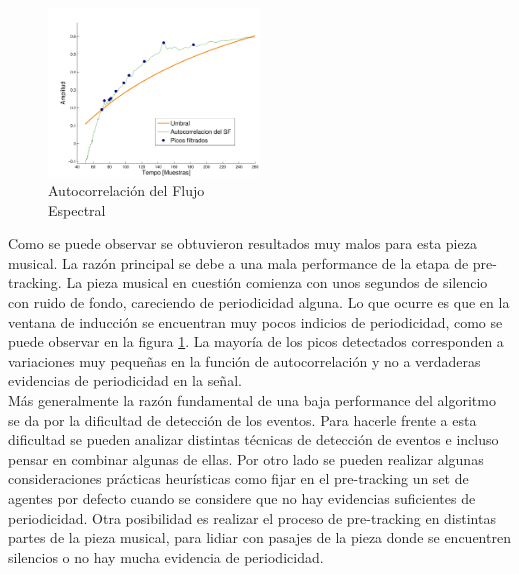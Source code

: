 \documentclass[12pt,a4paper,titlepage]{report}
\begin{document}
\begin{figure}
	\vspace{-45pt}
	\begin{center}
	\includegraphics[width=0.5\textwidth]{./pics/datos_2_18_A_autocorr.pdf}
	\end{center}
	\vspace{-20pt}
	\caption{Autocorrelación del Flujo\\Espectral}
	\label{fig:datos_2_18_A_autocorr}
	\vspace{-15pt}
\end{figure}

Como se puede observar se obtuvieron resultados muy malos para esta pieza musical. La razón principal se debe a una mala performance de la etapa de pre-tracking. La pieza musical en cuestión comienza con unos segundos de silencio con ruido de fondo, careciendo de periodicidad alguna. Lo que ocurre es que en la ventana de inducción se encuentran muy pocos indicios de periodicidad, como se puede observar en la figura \ref{fig:datos_2_18_A_autocorr}. La mayoría de los picos detectados corresponden a variaciones muy pequeñas en la función de autocorrelación y no a verdaderas evidencias de periodicidad en la señal. \\

Más generalmente la razón fundamental de una baja performance del algoritmo se da por la dificultad de detección de los eventos. Para hacerle frente a esta dificultad se pueden analizar distintas técnicas de detección de eventos e incluso pensar en combinar algunas de ellas. Por otro lado se pueden realizar algunas consideraciones prácticas heurísticas como fijar en el pre-tracking un set de agentes por defecto cuando se considere que no hay evidencias suficientes de periodicidad. Otra posibilidad es realizar el proceso de pre-tracking en distintas partes de la pieza musical, para lidiar con pasajes de la pieza donde se encuentren silencios o no hay mucha evidencia de periodicidad.
\end{document}
